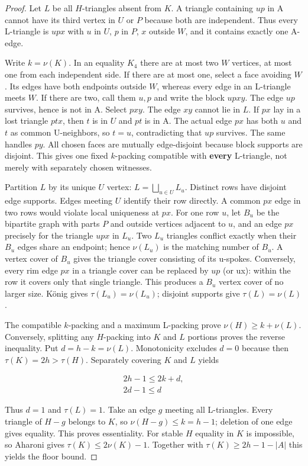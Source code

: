 \documentclass[11pt]{article}
\theoremstyle{definition}\newtheorem{definition}[theorem]{Definition}
\theoremstyle{remark}\newtheorem{remark}[theorem]{Remark}
\begin{document}
\begin{proof}\leavevmode
Let \(L\) be all \(H\)-triangles absent from \(K\). A triangle containing \(up\) in A cannot have its third vertex in \(U\) or \(P\) because both are independent. Thus every L-triangle is \(upx\) with \(u\) in \(U\), \(p\) in \(P\), \(x\) outside \(W\), and it contains exactly one A-edge.

Write \(k=\nu(K)\). In an equality \(K_4\) there are at most two \(W\) vertices, at most one from each independent side. If there are at most one, select a face avoiding \(W\). Its edges have both endpoints outside \(W\), whereas every edge in an L-triangle meets \(W\). If there are two, call them \(u,p\) and write the block \(upxy\). The edge \(up\) survives, hence is not in A. Select \(pxy\). The edge \(xy\) cannot lie in \(L\). If \(px\) lay in a lost triangle \(ptx\), then \(t\) is in \(U\) and \(pt\) is in A. The actual edge \(px\) has both \(u\) and \(t\) as common U-neighbors, so \(t=u\), contradicting that \(up\) survives. The same handles \(py\). All chosen faces are mutually edge-disjoint because block supports are disjoint. This gives one fixed \(k\)-packing compatible with \textbf{every} L-triangle, not merely with separately chosen witnesses.

Partition \(L\) by its unique \(U\) vertex: \(L=\bigsqcup_{u\in U}L_u\). Distinct rows have disjoint edge supports. Edges meeting \(U\) identify their row directly. A common \(px\) edge in two rows would violate local uniqueness at \(px\). For one row \(u\), let \(B_u\) be the bipartite graph with parts \(P\) and outside vertices adjacent to \(u\), and an edge \(px\) precisely for the triangle \(upx\) in \(L_u\). Two \(L_u\) triangles conflict exactly when their \(B_u\) edges share an endpoint; hence \(\nu(L_u)\) is the matching number of \(B_u\). A vertex cover of \(B_u\) gives the triangle cover consisting of its u-spokes. Conversely, every rim edge \(px\) in a triangle cover can be replaced by \(up\) (or ux): within the row it covers only that single triangle. This produces a \(B_u\) vertex cover of no larger size. König gives \(\tau(L_u)=\nu(L_u)\); disjoint supports give \(\tau(L)=\nu(L)\).

The compatible \(k\)-packing and a maximum L-packing prove \(\nu(H)\ge k+\nu(L)\). Conversely, splitting any \(H\)-packing into \(K\) and \(L\) portions proves the reverse inequality. Put \(d=h-k=\nu(L)\). Monotonicity excludes \(d=0\) because then \(\tau(K)=2h>\tau(H)\). Separately covering \(K\) and \(L\) yields

\begin{equation}
\begin{gathered}
2h-1 \le  2k+d, \\
2d-1 \le  d
\end{gathered}
\end{equation}

Thus \(d=1\) and \(\tau(L)=1\). Take an edge \(g\) meeting all L-triangles. Every triangle of \(H-g\) belongs to \(K\), so \(\nu(H-g)\le k=h-1\); deletion of one edge gives equality. This proves essentiality. For stable \(H\) equality in \(K\) is impossible, so Aharoni gives \(\tau(K)\le 2\nu(K)-1\). Together with \(\tau(K)\ge 2h-1-|A|\) this yields the floor bound.
\end{proof}
\end{document}
